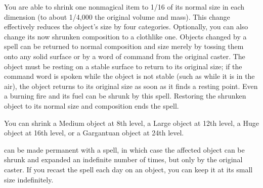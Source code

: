\begin{spelleffect}
  You are able to shrink one nonmagical item to 1/16 of its normal size in each dimension (to about 1/4,000 the original volume and mass). This change effectively reduces the object's size by four categories. Optionally, you can also change its now shrunken composition to a clothlike one. Objects changed by a  spell can be returned to normal composition and size merely by tossing them onto any solid surface or by a word of command from the original caster. The object must be resting on a stable surface to return to its original size; if the command word is spoken while the object is not stable (such as while it is in the air), the object returns to its original size as soon as it finds a resting point. Even a burning fire and its fuel can be shrunk by this spell. Restoring the shrunken object to its normal size and composition ends the spell.
  \par You can shrink a Medium object at 8th level, a Large object at 12th level, a Huge object at 16th level, or a Gargantuan object at 24th level.
\end{spelleffect}
\begin{spellnotes}
   can be made permanent with a  spell, in which case the affected object can be shrunk and expanded an indefinite number of times, but only by the original caster. If you recast the spell each day on an object, you can keep it at its small size indefinitely.
\end{spellnotes}

